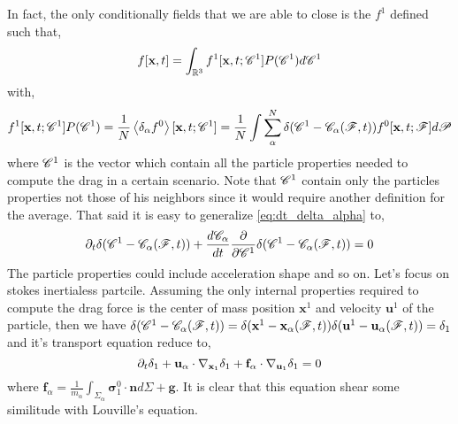 In fact, the only conditionally fields that we are able to close is the $f^1$ defined such that, 
\begin{equation}
    f[\textbf{x},t]
    = \int_{\mathbb{R}^3}
    f^1[\textbf{x},t;\mathscr{C}^1]
    P(\mathscr{C}^1) d\mathscr{C}^1
    \label{eq:avg_cond_C1}
\end{equation}
with, 
\begin{equation*}
    f^1[\textbf{x},t;\mathscr{C}^1] P(\mathscr{C}^1)
    =
    \frac{1}{N} 
    \left<\delta_\alpha f^0\right>[\textbf{x},t;\mathscr{C}^1]
    = 
    \frac{1}{N}
    \int 
    \sum_\alpha^N \delta(\mathscr{C}^1 - \mathscr{C}_\alpha(\mathscr{F},t))
    f^0[\textbf{x},t;\mathscr{F}]
    d\mathscr{P}
\end{equation*}
where $\mathscr{C}^1$ is the vector which contain all the particle properties needed to compute the drag in a certain scenario. 
Note that $\mathscr{C}^1$ contain only the particles properties not those of his neighbors since it would require another definition for the average. 
That said it is easy to generalize \ref{eq:dt_delta_alpha} to, 
\begin{equation*}
    \partial_t \delta(\mathscr{C}^1 - \mathscr{C}_\alpha(\mathscr{F},t))
    + \frac{d \mathscr{C}_\alpha}{dt}
    \frac{\partial }{\partial \mathscr{C}^1} \delta(\mathscr{C}^1 - \mathscr{C}_\alpha(\mathscr{F},t))
    = 0 
\end{equation*}
The particle properties could include acceleration shape and so on.
Let's focus on stokes inertialess partcile. 
Assuming the only internal properties required to compute the drag force is the center of mass position $\textbf{x}^1$ and velocity $\textbf{u}^1$ of the particle, then we have $\delta(\mathscr{C}^1 - \mathscr{C}_\alpha(\mathscr{F},t)) =\delta(\textbf{x}^1 - \textbf{x}_\alpha(\mathscr{F},t)) \delta(\textbf{u}^1 - \textbf{u}_\alpha(\mathscr{F},t)) = \delta_1 $ and it's transport equation reduce to, 
\begin{equation*}
    \partial_t \delta_1
    + 
    \textbf{u}_\alpha \cdot \mathbf{\nabla}_{\textbf{x}_1} \delta_1
    + \textbf{f}_\alpha \cdot \mathbf{\nabla}_{\textbf{u}_1} \delta_1
    = 0 
\end{equation*}
where $\textbf{f}_\alpha = \frac{1}{m_\alpha}\int_{\Sigma_\alpha} \bm\sigma_1^0 \cdot \textbf{n} d\Sigma + \textbf{g}$.  
It is clear that this equation shear some similitude with Louville's equation. 

